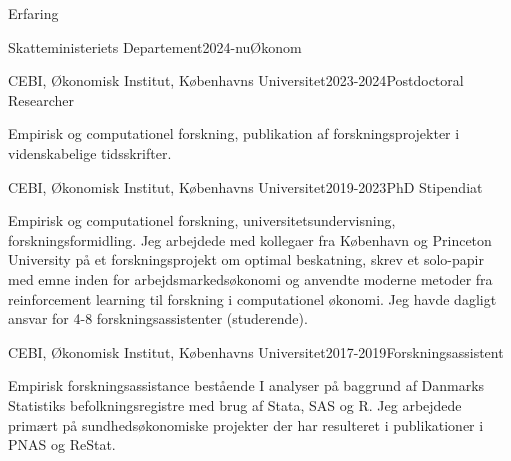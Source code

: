 \documentclass[
	10pt, %
]{resume} %
\begin{document}
\begin{rSection}{Erfaring}
    \begin{rSubsection}{Skatteministeriets Departement}{2024-nu}{Økonom}{}
        \item[] 
    \end{rSubsection}

    \begin{rSubsection}{CEBI, Økonomisk Institut, Københavns Universitet}{2023-2024}{Postdoctoral Researcher}{}
        \item[] Empirisk og computationel forskning, publikation af forskningsprojekter i videnskabelige tidsskrifter.
    \end{rSubsection}

    \begin{rSubsection}{CEBI, Økonomisk Institut, Københavns Universitet}{2019-2023}{PhD Stipendiat}{}
        \item[] Empirisk og computationel forskning, universitetsundervisning, forskningsformidling. Jeg arbejdede med kollegaer fra København og Princeton University på et forskningsprojekt om optimal beskatning, skrev et solo-papir med emne inden for arbejdsmarkedsøkonomi og anvendte moderne metoder fra reinforcement learning til forskning i computationel økonomi. Jeg havde dagligt ansvar for 4-8 forskningsassistenter (studerende).
    \end{rSubsection}

    \begin{rSubsection}{CEBI, Økonomisk Institut, Københavns Universitet}{2017-2019}{Forskningsassistent}{}
        \item[] Empirisk forskningsassistance bestående I analyser på baggrund af Danmarks Statistiks befolkningsregistre med brug af Stata, SAS og R. Jeg arbejdede primært på sundhedsøkonomiske projekter der har resulteret i publikationer i PNAS og ReStat.
    \end{rSubsection}


\end{rSection}
\end{document}
